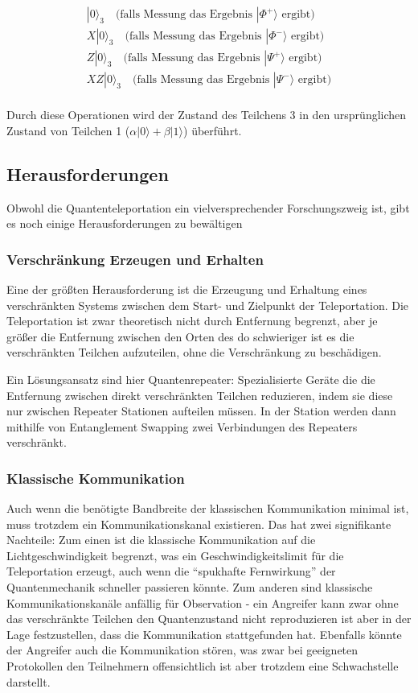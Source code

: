 \begin{gather*}
    |0\rangle_3 \quad \text{(falls Messung das Ergebnis } |\Phi^+\rangle\text{ ergibt)}\\
    X|0\rangle_3 \quad \text{(falls Messung das Ergebnis } |\Phi^-\rangle\text{ ergibt)}\\
    Z|0\rangle_3 \quad \text{(falls Messung das Ergebnis } |\Psi^+\rangle\text{ ergibt)}\\
    XZ|0\rangle_3 \quad \text{(falls Messung das Ergebnis } |\Psi^-\rangle\text{ ergibt)}\\
\end{gather*}

Durch diese Operationen wird der Zustand des Teilchens 3 in den ursprünglichen Zustand von Teilchen 1 (\( \alpha |0\rangle + \beta |1\rangle \)) überführt.


\subsection{Herausforderungen}\label{subsec:challenges}
Obwohl die Quantenteleportation ein vielversprechender Forschungszweig ist, gibt es noch einige Herausforderungen zu bewältigen

\subsubsection{Verschränkung Erzeugen und Erhalten}
Eine der größten Herausforderung ist die Erzeugung und Erhaltung eines verschränkten Systems zwischen dem Start- und Zielpunkt
der Teleportation.
Die Teleportation ist zwar theoretisch nicht durch Entfernung begrenzt, aber je größer die Entfernung zwischen den Orten
des do schwieriger ist es die verschränkten Teilchen aufzuteilen, ohne die Verschränkung zu beschädigen.

Ein Lösungsansatz sind hier Quantenrepeater: Spezialisierte Geräte die die Entfernung zwischen direkt verschränkten Teilchen reduzieren,
indem sie diese nur zwischen Repeater Stationen aufteilen müssen.
In der Station werden dann mithilfe von Entanglement Swapping zwei Verbindungen des Repeaters verschränkt.

\subsubsection{Klassische Kommunikation}
Auch wenn die benötigte Bandbreite der klassischen Kommunikation minimal ist, muss trotzdem ein Kommunikationskanal
existieren.
Das hat zwei signifikante Nachteile: Zum einen ist die klassische Kommunikation auf die Lichtgeschwindigkeit begrenzt,
was ein Geschwindigkeitslimit für die Teleportation erzeugt, auch wenn die ``spukhafte Fernwirkung'' der Quantenmechanik
schneller passieren könnte\cite{}.
Zum anderen sind klassische Kommunikationskanäle anfällig für Observation - ein Angreifer kann zwar
ohne das verschränkte Teilchen den Quantenzustand nicht reproduzieren ist aber in der Lage festzustellen, dass die
Kommunikation stattgefunden hat.
Ebenfalls könnte der Angreifer auch die Kommunikation stören, was zwar bei geeigneten Protokollen den Teilnehmern
offensichtlich ist aber trotzdem eine Schwachstelle darstellt.

